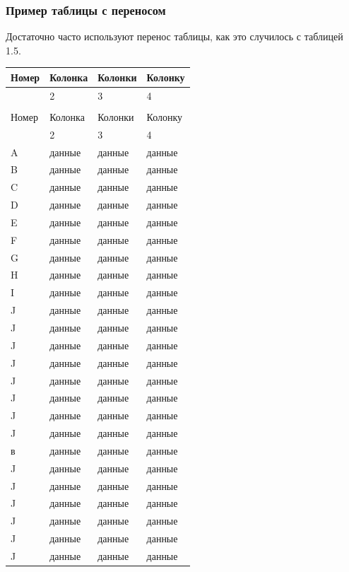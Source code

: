\subsubsection{Пример таблицы с переносом}

Достаточно часто используют перенос таблицы, как это случилось с таблицей 1.5.

\begin{tabularx}{\textwidth}{|>{\centering\arraybackslash}p{}|Y|Y|Y|}
\caption{Пример переноса таблицы}\label{tab:long}\\
\hline
Номер & Колонка & Колонки & Колонку \\
 & 2 & 3 & 4 \\
\hline
\endfirsthead

\\
\hline
Номер & Колонка & Колонки & Колонку \\
 & 2 & 3 & 4 \\
\hline
\endhead

\hline
\endfoot

\hline
\endlastfoot

A & данные & данные & данные \\
\hline
B & данные & данные & данные \\
\hline
C & данные & данные & данные \\
\hline
D & данные & данные & данные \\
\hline
E & данные & данные & данные \\
\hline
F & данные & данные & данные \\
\hline
G & данные & данные & данные \\
\hline
H & данные & данные & данные \\
\hline
I & данные & данные & данные \\
\hline
J & данные & данные & данные \\
\hline
J & данные & данные & данные \\
\hline
J & данные & данные & данные \\
\hline
J & данные & данные & данные \\
\hline
J & данные & данные & данные \\
\hline
J & данные & данные & данные \\
\hline
J & данные & данные & данные \\
\hline
J & данные & данные & данные \\
\hline
в & данные & данные & данные \\
\hline
J & данные & данные & данные \\
\hline
J & данные & данные & данные \\
\hline
J & данные & данные & данные \\
\hline
J & данные & данные & данные \\
\hline
J & данные & данные & данные \\
\hline
J & данные & данные & данные \\
\hline
\end{tabularx}

